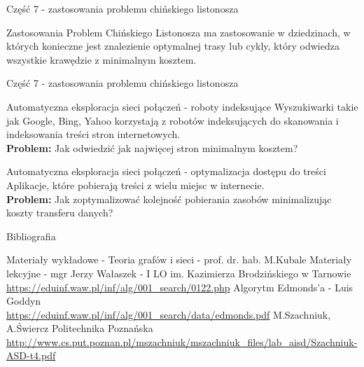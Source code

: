 \documentclass[polish,envcountsect,10pt]{beamer}
\begin{document}
\begin{frame}{Część 7 - zastosowania problemu chińskiego listonosza}
    \begin{block}{Zastosowania}
        Problem Chińskiego Listonosza ma zastosowanie w dziedzinach, w których konieczne jest znalezienie
        optymalnej trasy lub cykly, który odwiedza wszystkie krawędzie z minimalnym kosztem.
    \end{block}
\end{frame}

\begin{frame}{Część 7 - zastosowania problemu chińskiego listonosza}
    \begin{block}{Automatyczna eksploracja sieci połączeń - roboty indeksujące}
        Wyszukiwarki takie jak Google, Bing, Yahoo korzystają z robotów indeksujących do skanowania i indeksowania
        treści stron internetowych. \\\textbf{Problem:} Jak odwiedzić jak najwięcej stron minimalnym kosztem?
    \end{block}
    \begin{block}{Automatyczna eksploracja sieci połączeń - optymalizacja dostępu do treści}
        Aplikacje, które pobierają treści z wielu miejsc w internecie. \\\textbf{Problem:} Jak zoptymalizować kolejność pobierania zasobów minimalizując koszty transferu danych?
    \end{block}
\end{frame}

\begin{frame}{Bibliografia}
    \begin{thebibliography}{99}
             Materiały wykładowe - Teoria grafów i sieci - prof. dr. hab. M.Kubale
             Materiały lekcyjne - mgr Jerzy Wałaszek - I LO im. Kazimierza Brodzińskiego w Tarnowie \\\url{https://eduinf.waw.pl/inf/alg/001_search/0122.php}
             Algorytm Edmonds'a - Luis Goddyn \\\url{https://eduinf.waw.pl/inf/alg/001_search/data/edmonds.pdf}
             M.Szachniuk, A.Świercz Politechnika Poznańska \\\url{http://www.cs.put.poznan.pl/mszachniuk/mszachniuk_files/lab_aisd/Szachniuk-ASD-t4.pdf}
    \end{thebibliography}
\end{frame}
\end{document}
